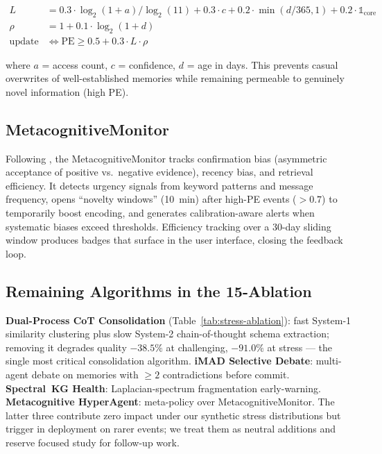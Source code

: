 \documentclass{article}
\begin{document}
\begin{align}
    L &= 0.3 \cdot \log_2(1+a)/\log_2(11) + 0.3 \cdot c + 0.2 \cdot \min(d/365, 1) + 0.2 \cdot \mathbb{1}_{\text{core}} \\
    \rho &= 1 + 0.1 \cdot \log_2(1+d) \\
    \text{update} &\iff \text{PE} \geq 0.5 + 0.3 \cdot L \cdot \rho
\end{align}

where $a$ = access count, $c$ = confidence, $d$ = age in days.
This prevents casual overwrites of well-established memories
while remaining permeable to genuinely novel information (high PE).

\subsection{MetacognitiveMonitor}
\label{sec:metacog}

Following \citet{fleming2012}, the MetacognitiveMonitor tracks
confirmation bias (asymmetric acceptance of positive vs.\ negative evidence),
recency bias, and retrieval efficiency.
It detects urgency signals from keyword patterns and message frequency,
opens ``novelty windows'' (10~min) after high-PE events ($>0.7$) to
temporarily boost encoding, and generates calibration-aware alerts when
systematic biases exceed thresholds.
Efficiency tracking over a 30-day sliding window produces badges
that surface in the user interface, closing the feedback loop.

\subsection{Remaining Algorithms in the 15-Ablation}
\label{sec:remaining-algos}

\textbf{Dual-Process CoT Consolidation} \citep{kahneman2011}
(Table~\ref{tab:stress-ablation}):
fast System-1 similarity clustering plus slow System-2 chain-of-thought
schema extraction; removing it degrades quality $-38.5\%$ at challenging,
$-91.0\%$ at stress --- the single most critical consolidation algorithm.
\textbf{iMAD Selective Debate}: multi-agent debate on memories with
$\geq 2$ contradictions before commit. \textbf{Spectral~KG Health}:
Laplacian-spectrum fragmentation early-warning. \textbf{Metacognitive
HyperAgent}: meta-policy over MetacognitiveMonitor. The latter three
contribute zero impact under our synthetic stress distributions but
trigger in deployment on rarer events; we treat them as neutral
additions and reserve focused study for follow-up work.
\end{document}
